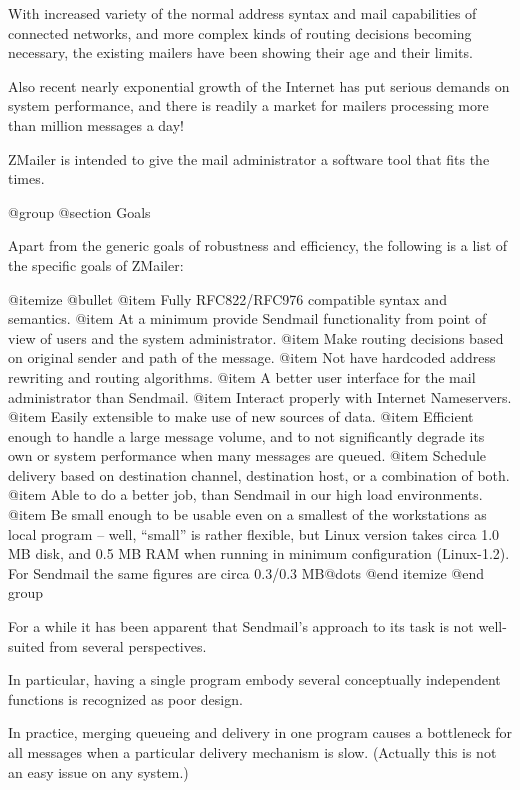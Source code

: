 With increased variety of the normal address syntax and mail
capabilities of connected networks, and more complex kinds of
routing decisions becoming necessary, the existing mailers have
been showing their age and their limits.

Also recent nearly exponential growth of the Internet has put
serious demands on system performance, and there is readily a
market for mailers processing more than million messages a day!

ZMailer is intended to give the mail administrator a software
tool that fits the times.

@group
@section Goals

Apart from the generic goals of robustness and efficiency,
the following is a list of the specific goals of ZMailer:

@itemize @bullet
@item
Fully RFC822/RFC976 compatible syntax and semantics.
@item
At a minimum provide Sendmail functionality from point of
view of users and the system administrator.
@item
Make routing decisions based on original sender and path
of the message.
@item
Not have hardcoded address rewriting and routing algorithms.
@item
A better user interface for the mail administrator than Sendmail.
@item
Interact properly with Internet Nameservers.
@item
Easily extensible to make use of new sources of data.
@item
Efficient enough to handle a large message volume, and to
not significantly degrade its own or system performance
when many messages are queued.
@item
Schedule delivery based on destination channel, destination host,
or a combination of both.
@item
Able to do a better job, than Sendmail in our high load environments.
@item
Be small enough to be usable even on a smallest of the workstations
as local program -- well, ``small'' is rather flexible, but Linux
version takes circa 1.0 MB disk, and 0.5 MB RAM when running in minimum
configuration (Linux-1.2).  For Sendmail the same figures are circa
0.3/0.3 MB@dots{}
@end itemize
@end group

For a while it has been apparent that Sendmail's approach to its
task is not well-suited from several perspectives.

In particular, having a single program embody several conceptually
independent functions is recognized as poor design.

In practice, merging queueing and delivery in one program causes
a bottleneck for all messages when a particular delivery mechanism
is slow. (Actually this is not an easy issue on any system.)



